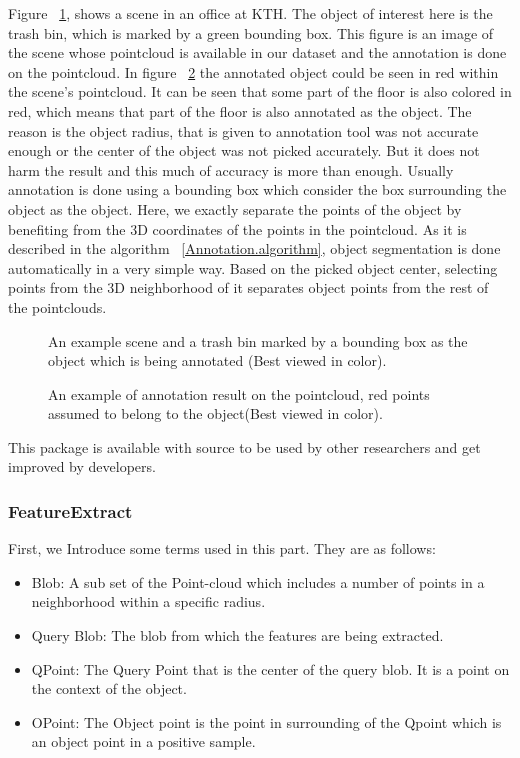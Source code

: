 Figure ~\ref{TrashbinBounding.figure}, shows a scene in an office at KTH. 
The object of interest here is the trash bin, which is marked by a green bounding box. 
This figure is an image of the scene whose pointcloud is available in our dataset and the annotation is done on 
the pointcloud. 
In figure ~\ref{Annotation.figure} the annotated object could be seen in red within the scene's pointcloud.
It can be seen that some part of the floor is also colored in red, which means that part of the floor is also 
annotated as the object.
The reason is the object radius, that is given to annotation tool was not accurate enough or the center of the 
object was not picked accurately.
But it does not harm the result and this much of accuracy is more than enough.
Usually annotation is done using a bounding box which consider the box surrounding the object as the object.
Here, we exactly separate the points of the object by benefiting from the 3D coordinates of the points in the 
pointcloud.
As it is described in the algorithm ~\ref{Annotation.algorithm}, object segmentation is done automatically in a very 
simple way.
Based on the picked object center, selecting points from the 3D neighborhood of it separates object points from the 
rest of the pointclouds.

\begin{figure}[t]
  \caption[Example scene and object for Annotation tool]
  {An example scene and a trash bin marked by a bounding box as the object which is being annotated (Best viewed in color).}
  \label{TrashbinBounding.figure}
\end{figure}

\begin{figure}[t]
  \caption[Annotation tool result]
  {An example of annotation result on the pointcloud, red points assumed to belong to the object(Best viewed in color).}
  \label{Annotation.figure}
\end{figure}

This package is available with source to be used by other researchers and get improved by developers.\cite{AnnotationGithub}


\subsubsection{FeatureExtract}
\label{FeatureExtract.ssec}
First, we Introduce some terms used in this part. They are as follows:
\begin{itemize}
  \item Blob: A sub set of the Point-cloud which includes a number of points in a neighborhood within a specific radius.
  \item Query Blob: The blob from which the features are being extracted.
  \item QPoint: The Query Point that is the center of the query blob. It is a point on the context of the object.
  \item OPoint: The Object point is the point in surrounding of the Qpoint which is an object point in a positive sample.
 \end{itemize}
 
